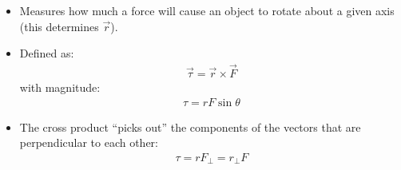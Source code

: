 \documentclass[aspectratio=169,
hyperref={colorlinks,urlcolor=blue}
]{beamer}
\begin{document}
{
\vspace{-0.25cm}
\begin{itemize}
\item Measures how much a force will cause an object to rotate about a given axis (this determines $\vec r$).
\item Defined as:
\begin{align*}
\vec \tau = \vec r \times \vec F
\end{align*} with magnitude:
\begin{align*}
\tau = rF\sin\theta
\end{align*}
\item<2-> The cross product ``picks out'' the components of the vectors that are perpendicular to each other:
\begin{align*}
\tau =r F_\perp = r_\perp F
\end{align*}
\end{itemize}
}
\end{document}
